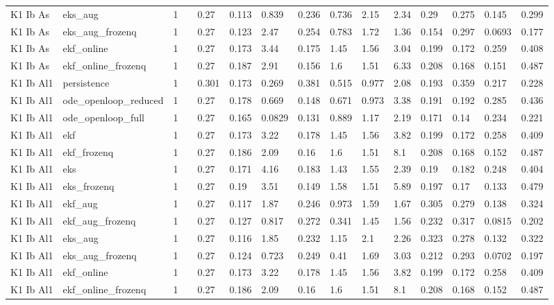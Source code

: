 \begin{table}[t]
\begin{tabular}{lllllllllllllll}
K1 Ib As & eks\_aug & 1 &  & 0.27 & 0.113 & 0.839 & 0.236 & 0.736 & 2.15 & 2.34 & 0.29 & 0.275 & 0.145 & 0.299 \\
K1 Ib As & eks\_aug\_frozenq & 1 &  & 0.27 & 0.123 & 2.47 & 0.254 & 0.783 & 1.72 & 1.36 & 0.154 & 0.297 & 0.0693 & 0.177 \\
K1 Ib As & ekf\_online & 1 &  & 0.27 & 0.173 & 3.44 & 0.175 & 1.45 & 1.56 & 3.04 & 0.199 & 0.172 & 0.259 & 0.408 \\
K1 Ib As & ekf\_online\_frozenq & 1 &  & 0.27 & 0.187 & 2.91 & 0.156 & 1.6 & 1.51 & 6.33 & 0.208 & 0.168 & 0.151 & 0.487 \\
K1 Ib Al1 & persistence & 1 &  & 0.301 & 0.173 & 0.269 & 0.381 & 0.515 & 0.977 & 2.08 & 0.193 & 0.359 & 0.217 & 0.228 \\
K1 Ib Al1 & ode\_openloop\_reduced & 1 &  & 0.27 & 0.178 & 0.669 & 0.148 & 0.671 & 0.973 & 3.38 & 0.191 & 0.192 & 0.285 & 0.436 \\
K1 Ib Al1 & ode\_openloop\_full & 1 &  & 0.27 & 0.165 & 0.0829 & 0.131 & 0.889 & 1.17 & 2.19 & 0.171 & 0.14 & 0.234 & 0.221 \\
K1 Ib Al1 & ekf & 1 &  & 0.27 & 0.173 & 3.22 & 0.178 & 1.45 & 1.56 & 3.82 & 0.199 & 0.172 & 0.258 & 0.409 \\
K1 Ib Al1 & ekf\_frozenq & 1 &  & 0.27 & 0.186 & 2.09 & 0.16 & 1.6 & 1.51 & 8.1 & 0.208 & 0.168 & 0.152 & 0.487 \\
K1 Ib Al1 & eks & 1 &  & 0.27 & 0.171 & 4.16 & 0.183 & 1.43 & 1.55 & 2.39 & 0.19 & 0.182 & 0.248 & 0.404 \\
K1 Ib Al1 & eks\_frozenq & 1 &  & 0.27 & 0.19 & 3.51 & 0.149 & 1.58 & 1.51 & 5.89 & 0.197 & 0.17 & 0.133 & 0.479 \\
K1 Ib Al1 & ekf\_aug & 1 &  & 0.27 & 0.117 & 1.87 & 0.246 & 0.973 & 1.59 & 1.67 & 0.305 & 0.279 & 0.138 & 0.324 \\
K1 Ib Al1 & ekf\_aug\_frozenq & 1 &  & 0.27 & 0.127 & 0.817 & 0.272 & 0.341 & 1.45 & 1.56 & 0.232 & 0.317 & 0.0815 & 0.202 \\
K1 Ib Al1 & eks\_aug & 1 &  & 0.27 & 0.116 & 1.85 & 0.232 & 1.15 & 2.1 & 2.26 & 0.323 & 0.278 & 0.132 & 0.322 \\
K1 Ib Al1 & eks\_aug\_frozenq & 1 &  & 0.27 & 0.124 & 0.723 & 0.249 & 0.41 & 1.69 & 3.03 & 0.212 & 0.293 & 0.0702 & 0.197 \\
K1 Ib Al1 & ekf\_online & 1 &  & 0.27 & 0.173 & 3.22 & 0.178 & 1.45 & 1.56 & 3.82 & 0.199 & 0.172 & 0.258 & 0.409 \\
K1 Ib Al1 & ekf\_online\_frozenq & 1 &  & 0.27 & 0.186 & 2.09 & 0.16 & 1.6 & 1.51 & 8.1 & 0.208 & 0.168 & 0.152 & 0.487 \\

\end{tabular}
\end{table}
